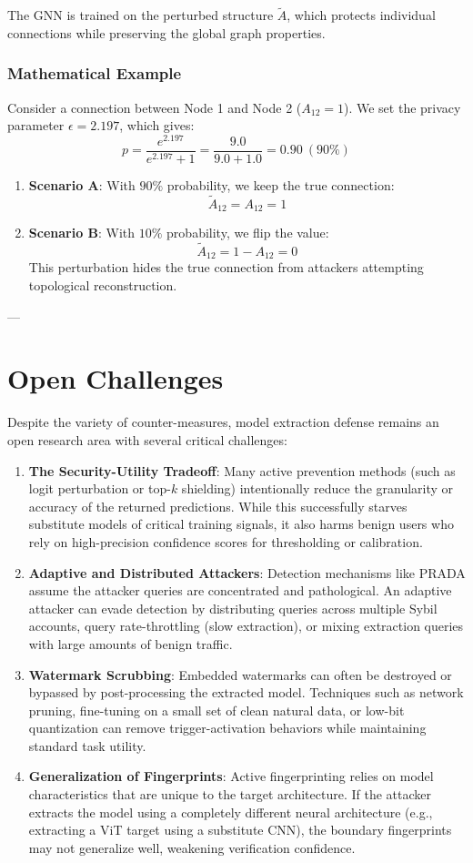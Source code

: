 \documentclass{article}
\begin{document}
The GNN is trained on the perturbed structure $\tilde{A}$, which protects individual connections while preserving the global graph properties.

\subsubsection{Mathematical Example}
Consider a connection between Node 1 and Node 2 ($A_{12} = 1$). We set the privacy parameter $\epsilon = 2.197$, which gives:
$$p = \frac{e^{2.197}}{e^{2.197} + 1} = \frac{9.0}{9.0 + 1.0} = 0.90 \ (90\%)$$
\begin{enumerate}
    \item \textbf{Scenario A}: With $90\%$ probability, we keep the true connection:
    $$\tilde{A}_{12} = A_{12} = 1$$
    
    \item \textbf{Scenario B}: With $10\%$ probability, we flip the value:
    $$\tilde{A}_{12} = 1 - A_{12} = 0$$
    This perturbation hides the true connection from attackers attempting topological reconstruction.
\end{enumerate}

---

\section{Open Challenges}

Despite the variety of counter-measures, model extraction defense remains an open research area with several critical challenges:
\begin{enumerate}
    \item \textbf{The Security-Utility Tradeoff}: Many active prevention methods (such as logit perturbation or top-$k$ shielding) intentionally reduce the granularity or accuracy of the returned predictions. While this successfully starves substitute models of critical training signals, it also harms benign users who rely on high-precision confidence scores for thresholding or calibration.
    \item \textbf{Adaptive and Distributed Attackers}: Detection mechanisms like PRADA assume the attacker queries are concentrated and pathological. An adaptive attacker can evade detection by distributing queries across multiple Sybil accounts, query rate-throttling (slow extraction), or mixing extraction queries with large amounts of benign traffic.
    \item \textbf{Watermark Scrubbing}: Embedded watermarks can often be destroyed or bypassed by post-processing the extracted model. Techniques such as network pruning, fine-tuning on a small set of clean natural data, or low-bit quantization can remove trigger-activation behaviors while maintaining standard task utility.
    \item \textbf{Generalization of Fingerprints}: Active fingerprinting relies on model characteristics that are unique to the target architecture. If the attacker extracts the model using a completely different neural architecture (e.g., extracting a ViT target using a substitute CNN), the boundary fingerprints may not generalize well, weakening verification confidence.
\end{enumerate}
\end{document}
